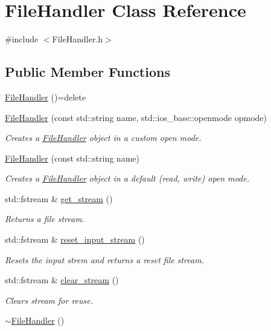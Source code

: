 \hypertarget{classFileHandler}{}\section{File\+Handler Class Reference}
\label{classFileHandler}


{\ttfamily \#include $<$File\+Handler.\+h$>$}

\subsection*{Public Member Functions}
\begin{DoxyCompactItemize}
\item 
\hyperlink{classFileHandler_a07661bacc2ad3e391e9a57a9080dc354}{File\+Handler} ()=delete
\item 
\hyperlink{classFileHandler_a2d2bdbea8aea3da7ccb7d45a4680d024}{File\+Handler} (const std\+::string name, std\+::ios\+\_\+base\+::openmode opmode)
\begin{DoxyCompactList}\small\item\em Creates a \hyperlink{classFileHandler}{File\+Handler} object in a custom open mode. \end{DoxyCompactList}\item 
\hyperlink{classFileHandler_abe0b1304883922e11676974a15f003df}{File\+Handler} (const std\+::string name)
\begin{DoxyCompactList}\small\item\em Creates a \hyperlink{classFileHandler}{File\+Handler} object in a default (read, write) open mode. \end{DoxyCompactList}\item 
std\+::fstream \& \hyperlink{classFileHandler_a52ed391e1cbce69535fe5dd554f205f2}{get\+\_\+stream} ()
\begin{DoxyCompactList}\small\item\em Returns a file stream. \end{DoxyCompactList}\item 
std\+::fstream \& \hyperlink{classFileHandler_a44807c8185a65201a5e183b634aacc6c}{reset\+\_\+input\+\_\+stream} ()
\begin{DoxyCompactList}\small\item\em Resets the input strem and returns a reset file stream. \end{DoxyCompactList}\item 
std\+::fstream \& \hyperlink{classFileHandler_a3ca63e1acff7135dd79f0da5534a0a29}{clear\+\_\+stream} ()
\begin{DoxyCompactList}\small\item\em Clears stream for reuse. \end{DoxyCompactList}\item 
\hyperlink{classFileHandler_a1ce10cd0ad31b313a8d526fba6f1e676}{$\sim$\+File\+Handler} ()
\end{DoxyCompactItemize}


